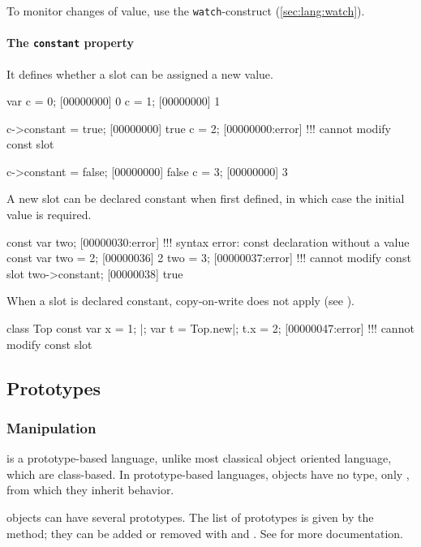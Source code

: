 To monitor changes of value, use the \lstinline|watch|-construct
(\autoref{sec:lang:watch}).



\paragraph{The \lstinline|constant| property}
It defines whether a slot can be assigned a new value.

\begin{urbiscript}
var c = 0;
[00000000] 0
c = 1;
[00000000] 1

c->constant = true;
[00000000] true
c = 2;
[00000000:error] !!! cannot modify const slot

c->constant = false;
[00000000] false
c = 3;
[00000000] 3
\end{urbiscript}

A new slot can be declared constant when first defined, in which case the
initial value is required.

\begin{urbiscript}
const var two;
[00000030:error] !!! syntax error: const declaration without a value
const var two = 2;
[00000036] 2
two = 3;
[00000037:error] !!! cannot modify const slot
two->constant;
[00000038] true
\end{urbiscript}

When a slot is declared constant, copy-on-write does not apply (see
).

\begin{urbiscript}
class Top
{
  const var x = 1;
}|;
var t = Top.new|;
t.x = 2;
[00000047:error] !!! cannot modify const slot
\end{urbiscript}



\subsection{Prototypes}

\subsubsection{Manipulation}

\us is a prototype-based language, unlike most classical object oriented
language, which are class-based. In prototype-based languages, objects have
no type, only , from which they inherit behavior.

\us objects can have several prototypes. The list of prototypes is given by
the  method; they can be added or removed with
 and .  See
 for more documentation.

